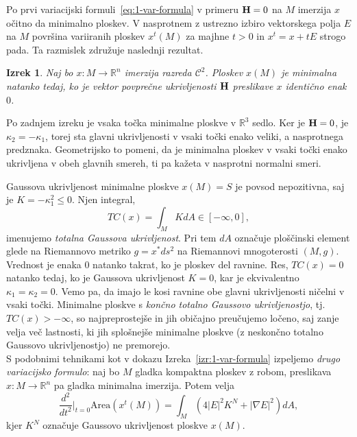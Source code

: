 \documentclass[12pt,a4paper,twoside]{article}
\theoremstyle{definition} %
\theoremstyle{plain} %
\newtheorem{izrek}[definicija]{Izrek}
\numberwithin{equation}{section}  %
\newcommand{\R}{\mathbb R}
\begin{document}
Po prvi variacijski formuli~\eqref{eq:1-var-formula} v primeru $\textbf{\textup{H}} = 0$ na $M$ imerzija $x$ očitno da minimalno ploskev. V nasprotnem z ustrezno izbiro vektorskega polja $E$ na $M$ površina variiranih ploskev $x^{t}(M)$ za majhne $t>0$ in $x^{t} = x + tE$ strogo pada. Ta razmislek združuje naslednji rezultat.

\begin{izrek} \label{izr:min-ekviv-H=0}
Naj bo $x \colon M \to \R^{n}$ imerzija razreda $\mathcal{C}^2$. Ploskev $x(M)$ je minimalna natanko tedaj, ko je vektor povprečne ukrivljenosti $\textbf{\textup{H}}$ preslikave $x$ identično enak $0$.
\end{izrek}

Po zadnjem izreku je vsaka točka minimalne ploskve v $\R^{3}$ sedlo. Ker je $\textup{\textbf{H}} = 0$, je $\kappa_2 = -\kappa_1$, torej sta glavni ukrivljenosti v vsaki točki enako veliki, a nasprotnega predznaka. Geometrijsko to pomeni, da je minimalna ploskev v vsaki točki enako ukrivljena v obeh glavnih smereh, ti pa kažeta v nasprotni normalni smeri.

Gaussova ukrivljenost minimalne ploskve $x(M)=S$ je povsod nepozitivna, saj je $K = -\kappa_{1}^2 \leq 0$.
Njen integral,
\begin{equation} \label{eq:TC-def}
TC(x) = \int_{M} K dA \in [-\infty, 0],
\end{equation} 
imenujemo \emph{totalna Gaussova ukrivljenost}. Pri tem $dA$ označuje ploščinski element glede na Riemannovo metriko $g = x^{*}ds^2$ na Riemannovi mnogoterosti $(M,g)$.
Vrednost je enaka $0$ natanko takrat, ko je ploskev del ravnine. Res, $TC(x) = 0$ natanko tedaj, ko je Gaussova ukrivljenost $K=0$, kar je ekvivalentno $\kappa_1=\kappa_2=0$. Vemo pa, da imajo le kosi ravnine obe glavni ukrivljenosti ničelni v vsaki točki.
Minimalne ploskve s \emph{končno totalno Gaussovo ukrivljenostjo}, tj.~$TC(x) > -\infty$, so najpreprostejše in jih običajno preučujemo ločeno, saj zanje velja več lastnosti, ki jih splošnejše minimalne ploskve (z neskončno totalno Gaussovo ukrivljenostjo) ne premorejo.\\[0.1cm]

S podobnimi tehnikami kot v dokazu Izreka~\ref{izr:1-var-formula} izpeljemo \emph{drugo variacijsko formulo}: naj bo $M$ gladka kompaktna ploskev z robom, preslikava $x \colon M \to \mathbb{R}^{n}$ pa gladka minimalna imerzija. Potem velja
\begin{equation} \label{eq:2-var-formula}
\frac{d^2}{dt^2} \Big|_{t=0} \text{Area} \left(x^{t}(M)\right) = \int_{M} {\left( 4|E|^{2} K^{N} + |\nabla{E}|^2 \right) dA},
\end{equation}
kjer $K^{N}$ označuje Gaussovo ukrivljenost ploskve $x(M)$.
\end{document}
